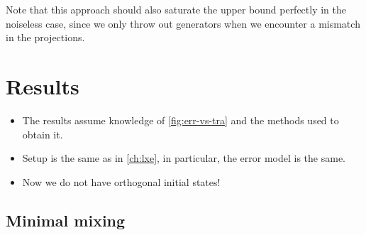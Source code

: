 Note that this approach should also saturate the upper bound perfectly in the
noiseless case, since we only throw out generators when we encounter a mismatch
in the projections.

\section{Results}\label{sec:upperbound-results}
\begin{itemize}
  \item The results assume knowledge of \cref{fig:err-vs-tra} and the methods
    used to obtain it.
  \item Setup is the same as in \cref{ch:lxe}, in particular, the error model
    is the same.
  \item Now we do not have orthogonal initial states!
\end{itemize}
\subsection{Minimal mixing}

